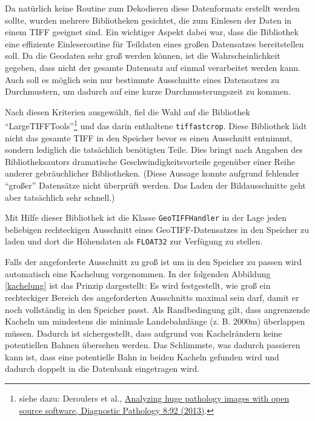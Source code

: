 \documentclass[10pt,a4paper]{report}
\begin{document}
Da natürlich keine Routine zum Dekodieren diese Datenformats erstellt werden sollte, wurden mehrere Bibliotheken gesichtet, die zum Einlesen der Daten in einem TIFF geeignet sind. Ein wichtiger Aspekt dabei war, dass die Bibliothek eine effiziente Einleseroutine für Teildaten eines großen Datensatzes bereitstellen soll. Da die Geodaten sehr groß werden können, ist die Wahrscheinlichkeit gegeben, dass nicht der gesamte Datensatz auf einmal verarbeitet werden kann. Auch soll es möglich sein nur bestimmte Ausschnitte eines Datensatzes zu Durchmustern, um dadurch auf eine kurze Durchmusterungszeit zu kommen.

Nach diesen Kriterien ausgewählt, fiel die Wahl auf die Bibliothek "`LargeTIFFTools"'\footnote{siehe dazu: Deroulers et al., \href{http://www.diagnosticpathology.org/content/8/1/92}{Analyzing huge pathology images with open source software, Diagnostic Pathology 8:92 (2013)}.} und das darin enthaltene \texttt{tiffastcrop}. Diese Bibliothek lädt nicht das gesamte TIFF in den Speicher bevor es einen Ausschnitt entnimmt, sondern lediglich die tatsächlich benötigten Teile. Dies bringt nach Angaben des Bibliotheksautors dramatische Geschwindigkeitsvorteile gegenüber einer Reihe anderer gebräuchlicher Bibliotheken. (Diese Aussage konnte aufgrund fehlender "`großer"' Datensätze nicht überprüft werden. Das Laden der Bildausschnitte geht aber tatsächlich sehr schnell.) 

Mit Hilfe dieser Bibliothek ist die Klasse \texttt{GeoTIFFHandler} in der Lage jeden beliebigen rechteckigen Ausschnitt eines GeoTIFF-Datensatzes in den Speicher zu laden und dort die Höhendaten als \texttt{FLOAT32} zur Verfügung zu stellen.

Falls der angeforderte Ausschnitt zu groß ist um in den Speicher zu passen wird automatisch eine Kachelung vorgenommen.
In der folgenden Abbildung \ref{kachelung} ist das Prinzip dargestellt: Es wird festgestellt, wie groß ein rechteckiger Bereich des angeforderten Ausschnitts maximal sein darf, damit er noch vollständig in den Speicher passt. Als Randbedingung gilt, dass angrenzende Kacheln um mindestens die minimale Landebahnlänge (z. B. 2000m) überlappen müssen. Dadurch ist sichergestellt, dass aufgrund von Kachelrändern keine potentiellen Bahnen übersehen werden. Das Schlimmste, was dadurch passieren kann ist, dass eine potentielle Bahn in beiden Kacheln gefunden wird und dadurch doppelt in die Datenbank eingetragen wird.
\end{document}
